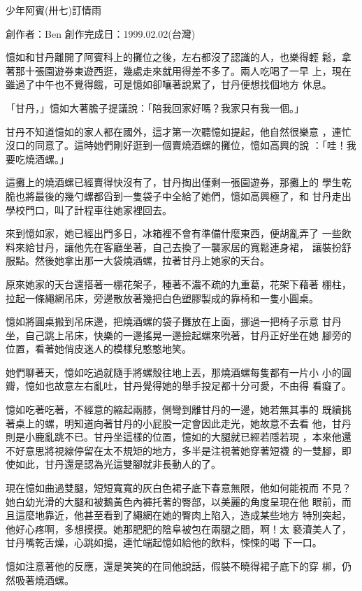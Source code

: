 



少年阿賓(卅七)訂情雨

創作者：Ben
創作完成日：1999.02.02(台灣)


憶如和甘丹離開了阿賓科上的攤位之後，左右都沒了認識的人，也樂得輕
鬆，拿著那十張園遊券東遊西逛，幾處走來就用得差不多了。兩人吃喝了一早
上，現在雖過了中午也不覺得餓，可是憶如卻嚷著說累了，甘丹便想找個地方
休息。

「甘丹，」憶如大著膽子提議說：「陪我回家好嗎？我家只有我一個。」

甘丹不知道憶如的家人都在國外，這才第一次聽憶如提起，他自然很樂意
，連忙沒口的同意了。這時她們剛好逛到一個賣燒酒螺的攤位，憶如高興的說
：「哇！我要吃燒酒螺。」

這攤上的燒酒螺已經賣得快沒有了，甘丹掏出僅剩一張園遊券，那攤上的
學生乾脆也將最後的幾勺螺都舀到一隻袋子中全給了她們，憶如高興極了，和
甘丹走出學校門口，叫了計程車往她家裡回去。

來到憶如家，她已經出門多日，冰箱裡不會有準備什麼東西，便胡亂弄了
一些飲料來給甘丹，讓他先在客廳坐著，自己去換了一襲家居的寬鬆連身裙，
讓裝扮舒服點。然後她拿出那一大袋燒酒螺，拉著甘丹上她家的天台。

原來她家的天台還搭著一棚花架子，種著不濃不疏的九重葛，花架下藉著
棚柱，拉起一條繩網吊床，旁邊散放著幾把白色塑膠製成的靠椅和一隻小圓桌。

憶如將圓桌搬到吊床邊，把燒酒螺的袋子攤放在上面，挪過一把椅子示意
甘丹坐，自己跳上吊床，快樂的一邊搖晃一邊撿起螺來吮著，甘丹正好坐在她
腳旁的位置，看著她俏皮迷人的模樣兒憨憨地笑。

她們聊著天，憶如吃過就隨手將螺殼往地上丟，那燒酒螺每隻都有一片小
小的圓瓣，憶如也故意左右亂吐，甘丹覺得她的舉手投足都十分可愛，不由得
看癡了。

憶如吃著吃著，不經意的縮起兩膝，側彎到離甘丹的一邊，她若無其事的
既續挑著桌上的螺，明知道向著甘丹的小屁股一定會因此走光，她故意不去看
他，甘丹則是小鹿亂跳不已。甘丹坐這樣的位置，憶如的大腿就已經若隱若現
，本來他還不好意思將視線停留在太不規矩的地方，多半是注視著她穿著短襪
的一雙腳，即使如此，甘丹還是認為光這雙腳就非長動人的了。

現在憶如曲過雙腿，短短寬寬的灰白色裙子底下春意無限，他如何能視而
不見？她白幼光滑的大腿和被鵝黃色內褲托著的臀部，以美麗的角度呈現在他
眼前，而且這麼地靠近，他甚至看到了繩網在她的臀肉上陷入，造成某些地方
特別突起，他好心疼啊，多想摸摸。她那肥肥的陰阜被包在兩腿之間，啊！太
褻瀆美人了，甘丹嘴乾舌燥，心跳如搗，連忙端起憶如給他的飲料，悚悚的喝
下一口。

憶如注意著他的反應，還是笑笑的在同他說話，假裝不曉得裙子底下的穿
梆，仍然吸著燒酒螺。

